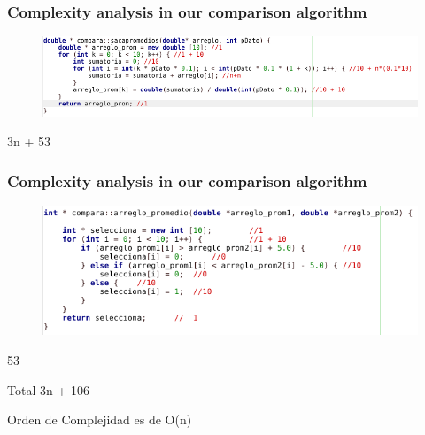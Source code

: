 \documentclass{beamer}
\begin{document}
\begin{frame}
\frametitle{Complexity analysis in our comparison algorithm}

\begin{figure}

\includegraphics[totalheight=2.4cm]{1.png}

\end{figure}

3n + 53


\end{frame}

\begin{frame}
\frametitle{Complexity analysis in our comparison algorithm}

\begin{figure}

\includegraphics[totalheight=3cm]{2.png}

\end{figure}

53

Total 3n + 106

Orden de Complejidad es de O(n)

\end{frame}
\end{document}
